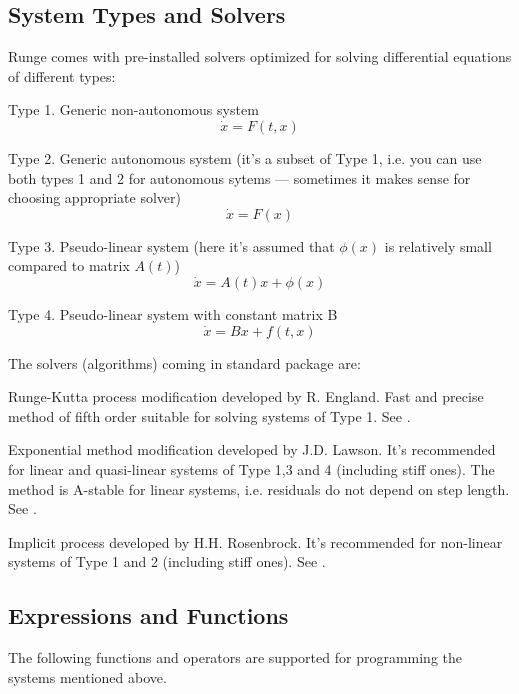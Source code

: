 \documentclass[12pt]{article}
\begin{document}
\subsection{System Types and Solvers}
Runge comes with pre-installed solvers optimized for solving differential equations of different types:
\begin{compactitem}
\item Type 1. Generic non-autonomous system
\[
\dot x=F(t,x)
\]
\item Type 2. Generic autonomous system (it's a subset of Type 1, 
i.e. you can use both types 1 and 2 for autonomous sytems --- sometimes 
it makes sense for choosing appropriate solver)
\[
\dot x=F(x)
\]
\item Type 3. Pseudo-linear system 
(here it's assumed that \(\phi(x)\) is relatively small compared to matrix \(A(t)\))
\[
\dot x=A(t)x+\phi(x)
\]
\item Type 4. Pseudo-linear system with constant matrix B
\[
\dot x=Bx+f(t,x)
\]
\end{compactitem}
The solvers (algorithms) coming in standard package are:
\begin{compactitem}
\item Runge-Kutta process modification developed by R. England. 
Fast and precise method of fifth order suitable for solving systems of Type 1.
See \cite{England}.
\item Exponential method modification developed by J.D. Lawson. 
It's recommended for linear and quasi-linear systems of Type 1,3 and 4 (including stiff ones).
The method is A-stable for linear systems, i.e. residuals do not depend on step length.
See \cite{Lawson}.
\item Implicit process developed by H.H. Rosenbrock. 
It's recommended for non-linear systems of Type 1 and 2 (including stiff ones).
See \cite{Rosenbrock}.
\end{compactitem}

\subsection{Expressions and Functions}

\EndLink
The following functions and operators are supported for programming the systems mentioned above.
\end{document}

